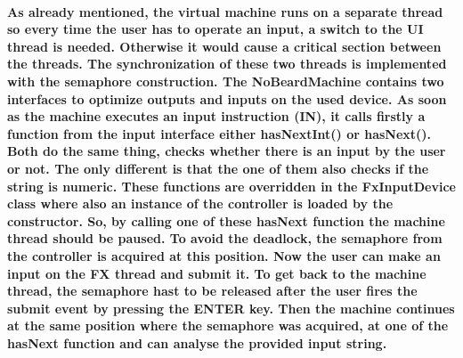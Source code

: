 \paragraph{As already mentioned, the virtual machine runs on a separate thread so every time the user has to operate an input, a switch to the UI thread is needed. Otherwise it would cause a critical section between the threads. The synchronization of these two threads is implemented with the semaphore construction. The NoBeardMachine contains two interfaces to optimize outputs and inputs on the used device. As soon as the machine executes an input instruction (IN), it calls firstly a function from the input interface either hasNextInt() or hasNext(). Both do the same thing, checks whether there is an input by the user or not. The only different is that the one of them also checks if the string is numeric. These functions are overridden in the FxInputDevice class where also an instance of the controller is loaded by the constructor. So, by calling one of these hasNext function the machine thread should be paused. To avoid the deadlock, the semaphore from the controller is acquired at this position. Now the user can make an input on the FX thread and submit it. To get back to the machine thread, the semaphore hast to be released after the user fires the submit event by pressing the ENTER key. Then the machine continues at the same position where the semaphore was acquired, at one of the hasNext function and can analyse the provided input string.}